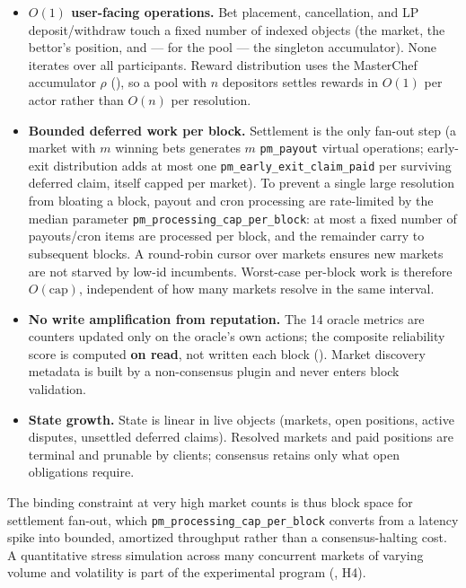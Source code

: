 \documentclass{ledger}
\theoremstyle{plain}
\theoremstyle{remark}
\begin{document}
\begin{itemize}
  \item \textbf{$O(1)$ user-facing operations.} Bet placement, cancellation, and
  LP deposit/withdraw touch a fixed number of indexed objects (the market, the
  bettor's position, and --- for the pool --- the singleton accumulator). None
  iterates over all participants. Reward distribution uses the MasterChef
  accumulator $\rho$ (), so a pool with $n$ depositors settles
  rewards in $O(1)$ per actor rather than $O(n)$ per resolution.
  \item \textbf{Bounded deferred work per block.} Settlement is the only fan-out
  step (a market with $m$ winning bets generates $m$ \texttt{pm\_payout} virtual
  operations; early-exit distribution adds at most one
  \texttt{pm\_early\_exit\_claim\_paid} per surviving deferred claim, itself
  capped per market). To prevent a single large resolution from bloating a
  block, payout and cron processing are rate-limited by the median parameter
  \texttt{pm\_processing\_cap\_per\_block}: at most a fixed number of
  payouts/cron items are processed per block, and the remainder carry to
  subsequent blocks. A round-robin cursor over markets ensures new markets are
  not starved by low-id incumbents. Worst-case per-block work is therefore
  $O(\text{cap})$, independent of how many markets resolve in the same interval.
  \item \textbf{No write amplification from reputation.} The 14 oracle metrics
  are counters updated only on the oracle's own actions; the composite
  reliability score is computed \textbf{on read}, not written each block
  (). Market discovery metadata is built by a
  non-consensus plugin and never enters block validation.
  \item \textbf{State growth.} State is linear in live objects (markets, open
  positions, active disputes, unsettled deferred claims). Resolved markets and
  paid positions are terminal and prunable by clients; consensus retains only
  what open obligations require.
\end{itemize}

The binding constraint at very high market counts is thus block space for
settlement fan-out, which \texttt{pm\_processing\_cap\_per\_block} converts from
a latency spike into bounded, amortized throughput rather than a
consensus-halting cost. A quantitative stress simulation across many concurrent
markets of varying volume and volatility is part of the experimental program
(, H4).
\end{document}
